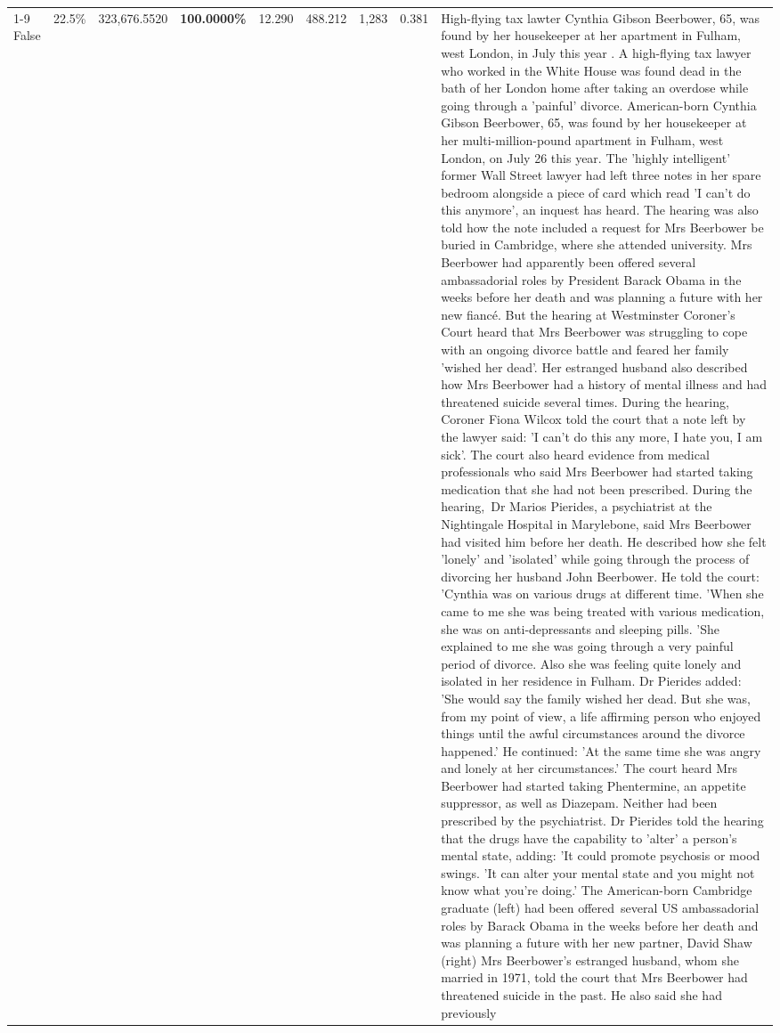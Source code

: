 \begin{table}[H]
\begin{tabular}{lllrlllll}
\cline{1-9}
False & 22.5\% & 323,676.5520 & \bfseries \color{red} 100.0000\% & 12.290 & 488.212 & 1,283 & 0.381 & High-flying tax lawter Cynthia Gibson Beerbower, 65, was found by her housekeeper at her apartment in Fulham, west London, in July this year . A high-flying tax lawyer who worked in the White House was found dead in the bath of her London home after taking an overdose while going through a 'painful' divorce. American-born Cynthia Gibson Beerbower, 65, was found by her housekeeper at her multi-million-pound apartment in Fulham, west London, on July 26 this year. The 'highly intelligent' former Wall Street lawyer had left three notes in her spare bedroom alongside a piece of card which read 'I can't do this anymore', an inquest has heard. The hearing was also told how the note included a request for Mrs Beerbower be buried in Cambridge, where she attended university. Mrs Beerbower had apparently been offered several ambassadorial roles by President Barack Obama in the weeks before her death and was planning a future with her new fiancé. But the hearing at Westminster Coroner's Court heard that Mrs Beerbower was struggling to cope with an ongoing divorce battle and feared her family 'wished her dead'. Her estranged husband also described how Mrs Beerbower had a history of mental illness and had threatened suicide several times. During the hearing, Coroner Fiona Wilcox told the court that a note left by the lawyer said: 'I can't do this any more, I hate you, I am sick'. The court also heard evidence from medical professionals who said Mrs Beerbower had started taking medication that she had not been prescribed. During the hearing, Dr Marios Pierides, a psychiatrist at the Nightingale Hospital in Marylebone, said Mrs Beerbower had visited him before her death. He described how she felt 'lonely' and 'isolated' while going through the process of divorcing her husband John Beerbower. He told the court: 'Cynthia was on various drugs at different time. 'When she came to me she was being treated with various medication, she was on anti-depressants and sleeping pills. 'She explained to me she was going through a very painful period of divorce. Also she was feeling quite lonely and isolated in her residence in Fulham. Dr Pierides added: 'She would say the family wished her dead. But she was, from my point of view, a life affirming person who enjoyed things until the awful circumstances around the divorce happened.' He continued: 'At the same time she was angry and lonely at her circumstances.' The court heard Mrs Beerbower had started taking Phentermine, an appetite suppressor, as well as Diazepam. Neither had been prescribed by the psychiatrist. Dr Pierides told the hearing that the drugs have the capability to 'alter' a person's mental state, adding: 'It could promote psychosis or mood swings. 'It can alter your mental state and you might not know what you're doing.' The American-born Cambridge graduate (left) had been offered several US ambassadorial roles by Barack Obama in the weeks before her death and was planning a future with her new partner, David Shaw (right) Mrs Beerbower's estranged husband, whom she married in 1971, told the court that Mrs Beerbower had threatened suicide in the past. He also said she had previously 
\end{tabular}
\end{table}
